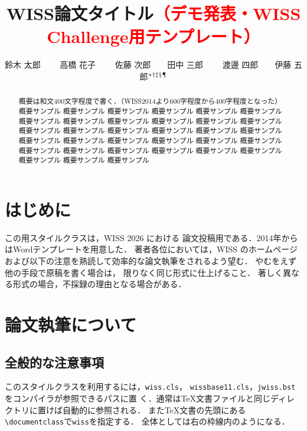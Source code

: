 \documentclass[twoside]{wiss}
\begin{document}
\title{WISS論文タイトル\textcolor{red}{（デモ発表・WISS Challenge用テンプレート）}}
\etitle{}%
%
%
%
\author{鈴木 太郎 　　高橋 花子
　　佐藤 次郎　　田中 三郎
　　渡邊 四郎　　伊藤 五郎${}^* {}^\dag {}^\ddag {}^\mathsection
{}^\mathparagraph$}

\begin{abstract}
概要は和文400文字程度で書く．（WISS2014より600字程度から400字程度となった）
概要サンプル 概要サンプル 概要サンプル 概要サンプル 概要サンプル 概要サンプル
概要サンプル 概要サンプル 概要サンプル 概要サンプル 概要サンプル 概要サンプル
概要サンプル 概要サンプル 概要サンプル 概要サンプル 概要サンプル 概要サンプル
概要サンプル 概要サンプル 概要サンプル 概要サンプル 概要サンプル 概要サンプル
概要サンプル 概要サンプル 概要サンプル 概要サンプル 概要サンプル 概要サンプル
概要サンプル 概要サンプル 概要サンプル
\end{abstract}

\maketitle

\section{はじめに}

この\LaTeXe{}用スタイルクラスは，WISS 2026 における
論文投稿用である．2014年からはWordテンプレートを用意した．
著者各位においては，WISS のホームページ\cite{wiss}
および以下の注意を熟読して効率的な論文執筆をされるよう望む．
やむをえず他の手段で原稿を書く場合は，
限りなく同じ形式に仕上げること．
著しく異なる形式の場合，不採録の理由となる場合がある．

\section{論文執筆について}

\subsection{全般的な注意事項}

このスタイルクラスを利用するには，\verb|wiss.cls|，
\verb|wissbase11.cls|，\verb|jwiss.bst|をコンパイラが参照できるパスに置
く．通常は\TeX 文書ファイルと同じディレクトリに置けば自動的に参照される．
また\TeX 文書の先頭にある\verb|\documentclass|で\verb|wiss|を指定する．
全体としては右の枠線内のようになる．
\end{document}
